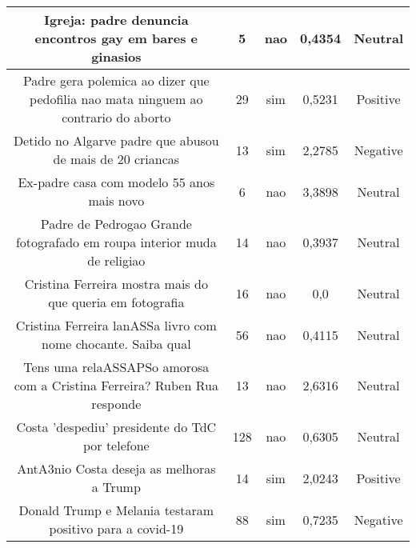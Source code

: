 \documentclass[11pt]{article}
\newlength\mylength
\begin{document}
\begin{center}
\begin{longtable}{||C{.40\mylength}||C{.20\mylength}||C{.20\mylength}||C{.30\mylength}||C{.20\mylength}||}
   Igreja: padre denuncia encontros gay em bares e ginasios  & 5 & nao & 0,4354 & Neutral \\  \hline
   Padre gera polemica ao dizer que pedofilia nao mata ninguem ao contrario do aborto  & 29 & sim & 0,5231 & Positive \\  \hline
   Detido no Algarve padre que abusou de mais de 20 criancas  & 13 & sim & 2,2785 & Negative \\  \hline
   Ex-padre casa com modelo 55 anos mais novo  & 6 & nao & 3,3898 & Neutral \\  \hline
   Padre de Pedrogao Grande fotografado em roupa interior muda de religiao  & 14 & nao & 0,3937 & Neutral \\  \hline
   Cristina Ferreira mostra mais do que queria em fotografia  & 16 & nao & 0,0 & Neutral \\  \hline
   Cristina Ferreira lanASSa livro com nome chocante. Saiba qual  & 56 & nao & 0,4115 & Neutral \\  \hline
   Tens uma relaASSAPSo amorosa com a Cristina Ferreira? Ruben Rua responde  & 13 & nao & 2,6316 & Neutral \\  \hline
   Costa 'despediu' presidente do TdC por telefone  & 128 & nao & 0,6305 & Neutral \\  \hline
   AntA3nio Costa deseja as melhoras a Trump  & 14 & sim & 2,0243 & Positive \\  \hline
   Donald Trump e Melania testaram positivo para a covid-19  & 88 & sim & 0,7235 & Negative \\  \hline

\end{longtable}
\end{center}
\end{document}
